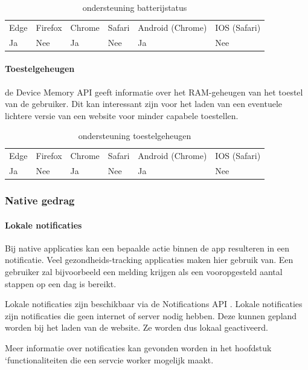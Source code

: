\begin{table}[H]
	\centering
	\begin{tabular}{llllll}
		Edge & Firefox & Chrome & Safari & Android (Chrome) & IOS (Safari) \\
		Ja   & Nee      &  Ja     & Nee     & Ja               & Nee          
	\end{tabular}	
	\caption{ondersteuning batterijstatus  }
\end{table}

\paragraph{Toestelgeheugen}
de Device Memory API \autocite{Panicker2020} geeft informatie over het RAM-geheugen van het toestel van de gebruiker. Dit kan interessant zijn voor het laden van een eventuele lichtere versie van een website voor minder capabele toestellen.

\begin{table}[H]
	\centering
	\begin{tabular}{llllll}
		Edge & Firefox & Chrome & Safari & Android (Chrome) & IOS (Safari) \\
		Ja   & Nee      &  Ja     & Nee     & Ja               & Nee          
	\end{tabular}	
	\caption{ondersteuning toestelgeheugen }
\end{table}



\subsubsection{Native gedrag}

\paragraph{Lokale notificaties}
Bij native applicaties kan een bepaalde actie binnen de app resulteren in een notificatie. Veel gezondheids-tracking applicaties maken hier gebruik van. Een gebruiker zal bijvoorbeeld een melding krijgen als een vooropgesteld aantal stappen op een dag is bereikt.

Lokale notificaties zijn beschikbaar via de Notifications API \autocite{Gregg2020}. Lokale notificaties zijn notificaties die geen internet of server nodig hebben. Deze kunnen gepland worden bij het laden van de website. Ze worden dus lokaal geactiveerd.

Meer informatie over notificaties kan gevonden worden in het hoofdstuk ‘functionaliteiten die een servcie worker mogelijk maakt.

